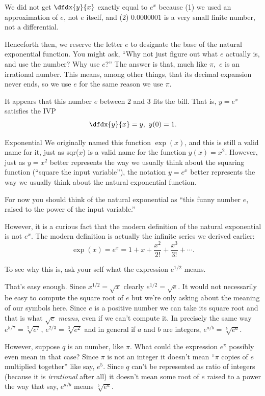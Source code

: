 We did not get $\dfdx{y}{x}$ exactly equal to $e^x$ because (1) we used
an approximation of $e$, not $e$ itself, and (2) $0.0000001$ is a very
small \alert{finite} number, not a differential.

Henceforth then, we reserve the letter $e$ to designate the base of
the natural exponential function. You might ask, ``Why not just figure
out what $e$ actually is, and use the number? Why use $e$?''  The
answer is that, much like $\pi,$  $e$ is an irrational number. This means, among
other things, that its decimal expansion never ends, so we use $e$ for
the same reason we use $\pi$.

It appears that this number $e$ between $2$ and $3$ fits the bill.
That is, $y=e^x$ satisfies the
IVP
$$
\dfdx{y}{x}=y,\ y(0)=1.
$$
\begin{mynotation}{Exponential}
  We originally named this function $\exp(x)$, and this is still a
  valid name for it, just as sqr($x$) is a valid name for the function
  $y(x)=x^2$. However, just as $y=x^2$ better represents the way we
  usually think about the squaring function (``square the input
  variable''), the notation $y=e^x$ better represents the way we
  usually think about the natural exponential function.

  For now you should think of the natural exponential as ``this funny
  number $e$, raised to the power of the input variable.''

  However, it is a curious fact that the modern definition of the
  natural exponential is \alert{not} $e^x.$ The modern definition is
  actually the infinite series we derived earlier:
  $$\exp(x)=e^x=1+x+\frac{x^2}{2!}+\frac{x^3}{3!}+ \cdots.$$

  To see why this is, ask your self what the expression $e^{1/2}$
  means.

  That's easy enough. Since $x^{1/2}=\sqrt{x}$ clearly
  $e^{1/2}=\sqrt{e}.$ It would not necessarily be easy to compute the
  square root of $e$ but we're only asking about the meaning of our
  symbols here. Since $e$ is a positive number we can take its square
  root and that is what $\sqrt{e}$ {\it{}means}, even if we can't
  compute it. In precisely the same way $e^{5/7}=\sqrt[5]{e^7}$,
  $e^{2/3}=\sqrt[3]{e^2}$ and in general if $a$ and $b$ are integers,
  $e^{a/b}=\sqrt[b]{e^a}$.

  However, suppose $q$ is an  number, like $\pi$.  What could the expression $e^\pi$ possibly even mean in
  that case? Since $\pi$ is not an integer it doesn't mean ``$\pi$ copies
  of $e$ multiplied together'' like say, $e^5.$ Since $q$ can't be
  represented as ratio of integers (because it is \emph{irrational}
  after all) it doesn't mean some root of $e$ raised to a power the
  way that say, $e^{a/b}$ means $\sqrt[b]{e^a}.$


\end{mynotation}
